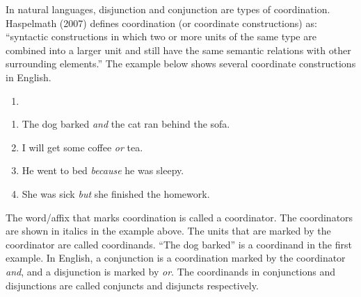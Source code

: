 \documentclass[oneside]{report}
\theoremstyle{definition}
\theoremstyle{definition}
\theoremstyle{definition}
\theoremstyle{remark}
\begin{document}
In natural languages, disjunction and conjunction are types of
coordination. Haspelmath (2007) defines coordination (or coordinate
constructions) as: ``syntactic constructions in which two or more units
of the same type are combined into a larger unit and still have the same
semantic relations with other surrounding elements.'' The example below
shows several coordinate constructions in English.
\begin{enumerate}
\def\labelenumi{(\arabic{enumi})}
\item
\end{enumerate}
\begin{enumerate}
\def\labelenumi{\alph{enumi}.}
\tightlist
\item
  The dog barked \emph{and} the cat ran behind the sofa.
\item
  I will get some coffee \emph{or} tea.
\item
  He went to bed \emph{because} he was sleepy.
\item
  She was sick \emph{but} she finished the homework.
\end{enumerate}
The word/affix that marks coordination is called a coordinator. The
coordinators are shown in italics in the example above. The units that
are marked by the coordinator are called coordinands. ``The dog barked''
is a coordinand in the first example. In English, a conjunction is a
coordination marked by the coordinator \emph{and}, and a disjunction is
marked by \emph{or}. The coordinands in conjunctions and disjunctions
are called conjuncts and disjuncts respectively.
\end{document}
